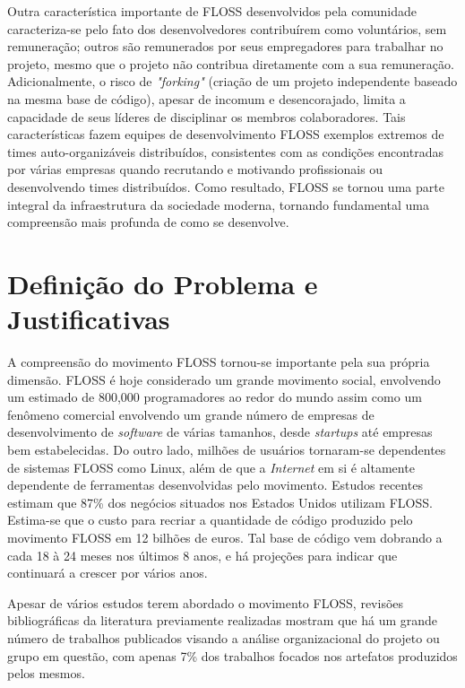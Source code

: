 Outra característica importante de FLOSS desenvolvidos pela comunidade caracteriza-se pelo fato dos desenvolvedores contribuírem como voluntários, sem remuneração; outros são remunerados por seus empregadores para trabalhar no projeto, mesmo que o projeto não contribua diretamente com a sua remuneração. Adicionalmente, o risco de \textit{"forking"} (criação de um projeto independente baseado na mesma base de código), apesar de incomum e desencorajado, limita a capacidade de seus líderes de disciplinar os membros colaboradores. Tais características fazem equipes de desenvolvimento FLOSS exemplos extremos de times auto-organizáveis distribuídos, consistentes com as condições encontradas por várias empresas quando recrutando e motivando profissionais ou desenvolvendo times distribuídos.
Como resultado, FLOSS se tornou uma parte integral da infraestrutura da sociedade moderna, tornando fundamental uma compreensão mais profunda de como se desenvolve.




\section{Definição do Problema e Justificativas}

A compreensão do movimento FLOSS tornou-se importante pela sua própria dimensão\cite{crowston2012free}. FLOSS é hoje considerado um grande movimento social, envolvendo um estimado de 800,000 programadores ao redor do mundo assim como um fenômeno comercial envolvendo um grande número de empresas de desenvolvimento de \textit{software} de várias tamanhos, desde \textit{startups} até empresas bem estabelecidas. Do outro lado, milhões  de usuários tornaram-se dependentes de sistemas FLOSS como Linux, além de que a \textit{Internet} em si é altamente dependente de ferramentas desenvolvidas pelo movimento. Estudos recentes estimam que 87\% dos negócios situados nos Estados Unidos utilizam FLOSS. Estima-se que o custo para recriar a quantidade de código produzido pelo movimento FLOSS em 12 bilhões de euros. Tal base de código vem dobrando a cada 18 à 24 meses nos últimos 8 anos, e há projeções para indicar que continuará a crescer por vários anos\cite{ghosh2007economic}. 

Apesar de vários estudos terem abordado o movimento FLOSS, revisões bibliográficas da literatura previamente realizadas\cite{crowston2012free} mostram que 
há um grande número de trabalhos publicados visando a análise organizacional do projeto ou grupo em questão, com apenas 7\% dos trabalhos focados nos artefatos produzidos pelos mesmos. 

